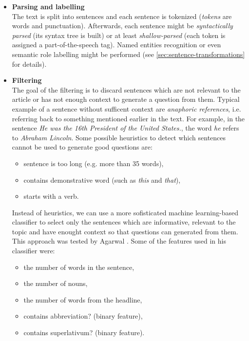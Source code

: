 \documentclass[a4paper, 12pt, twoside]{fithesis2}		%
\renewcommand{\_}{\leavevmode \kern0.07em\vbox{\hrule width0.4em}}
\newcommand{\squarebullet}{\textcolor{black}{\raisebox{0.15em}{\rule{4pt}{4pt}}}}
\newcommand{\emptysquarebullet}{\textcolor{black}{\raisebox{0.10em}{\tiny$\square$}}}
\newenvironment{myItemize}{
  \begin{itemize}[leftmargin=2em,rightmargin=1em,itemsep=\parskip ,parsep=0em,topsep=0em,partopsep=0em]
  \renewcommand{\labelitemi}{\squarebullet}
  \renewcommand{\labelitemii}{\textbullet}
}{
  \end{itemize}
}
\begin{document}
\begin{myItemize}
  \item \textbf{Parsing and labelling}\\
    The text is split into sentences and each sentence is tokenized (\emph{tokens} are words and punctuation).
    Afterwards, each sentence might be \emph{syntactically parsed} (its syntax tree is built)
    or at least \textit{shallow-parsed} (each token is assigned a part-of-the-speech tag).
    Named entities recognition or even semantic role labelling might be performed
    (see \autoref{sec:sentence-transformations} for details).

  \item \textbf{Filtering}\\
    The goal of the filtering is to discard sentences which are not relevant to the article or has not enough context to generate a question from them.
    Typical example of a sentence without sufficent context are \emph{anaphoric references},
    i.e. referring back to something mentioned earlier in the text.
    For example, in the sentence \emph{He was the 16th President of the United States.},
    the word \emph{he} refers to \emph{Abraham Lincoln}.
  Some possible heuristics to detect which sentences cannot be used to generate good questions \cite{questions-wolfe} are:
  \begin{itemize}
  \item sentence is too long (e.g. more than 35 words),
  \item contains demonstrative word (such as \emph{this} and \emph{that}),
  \item starts with a verb.
  \end{itemize}

  Instead of heuristics, we can use a more sofisticated machine learning-based classifier to select only the sentences which are informative, relevant to the topic and have enought context so that questions can generated from them. This approach was tested by Agarwal \cite{question-gen-textbooks}.
Some of the features used in his classifier were:
  \begin{itemize}
  \item the number of words in the sentence,
  \item the number of nouns,
  \item the number of words from the headline,
  \item contains abbreviation? (binary feature),
  \item contains superlativum? (binary feature).
  \end{itemize}


\end{myItemize}
\end{document}
